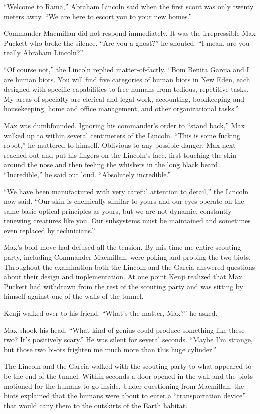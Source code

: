 \documentclass[]{article}
\begin{document}
{“Welcome to Rama,” Abraham Lincoln said when the first scout was only twenty meters away. “We are here to escort you to your new homes.”

Commander Macmillan did not respond immediately. It was the irrepressible Max Puckett who broke the silence. “Are you a ghost?” he shouted. “I mean, are you really Abraham Lincoln?”

“Of course not,” the Lincoln replied matter-of-factly. “Bom Benita Garcia and I are human biots. You will find five categories of human biots in New Eden, each designed with specific capabilities to free humans from tedious, repetitive tasks. My areas of specialty arc clerical and legal work, accounting, bookkeeping and housekeeping, home and office management, and other organizational tasks.”

Max was dumbfounded. Ignoring his commander’s order to “stand back,” Max walked up to within several centimeters of the Lincoln. “This is some fucking robot,” he muttered to himself. Oblivious to any possible danger, Max next reached out and put his fingers on the Lincoln’s face, first touching the skin around the nose and then feeling the whiskers in the long black beard. “Incredible,” he said out loud. “Absolutely incredible.”

“We have been manufactured with very careful attention to detail,” the Lincoln now said. “Our skin is chemically similar to yours and our eyes operate on the same basic optical principles as yours, but we are not dynamic, constantly renewing creatures like you. Our subsystems must be maintained and sometimes even replaced by technicians.”

Max’s bold move had defused all the tension. By mis time me entire scouting party, including Commander Macmillan, were poking and probing the two biots. Throughout the examination both the Lincoln and the Garcia answered questions about their design and implementation. At one point Kenji realized that Max Puckett had withdrawn from the rest of the scouting party and was sitting by himself against one of the walls of the tunnel.

Kenji walked over to his friend. “What’s the matter, Max?” he asked.

Max shook his head. “What kind of genius could produce something like these two? It’s positively scary.” He was silent for several seconds. “Maybe I’m strange, but those two bi-ots frighten me much more than this huge cylinder.”

The Lincoln and the Garcia walked with the scouting party to what appeared to be the end of the tunnel. Within seconds a door opened in the wall and the biots motioned for the humans to go inside. Under questioning from Macmillan, the biots explained that the humans were about to enter a “transportation device” that would cany them to the outskirts of the Earth habitat.

}
\end{document}
